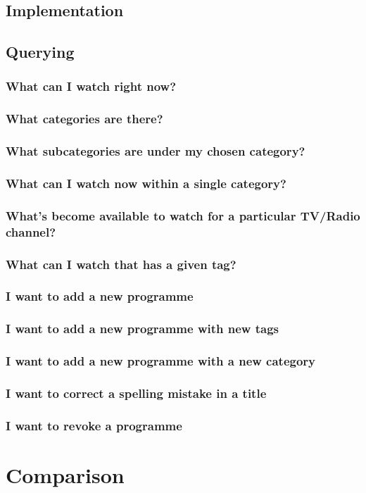 \documentclass[11pt,a4paper]{article}
\begin{document}
\subsection{Implementation}
\subsection{Querying}
\subsubsection{What can I watch right now?}
\subsubsection{What categories are there?}
\subsubsection{What subcategories are under my chosen category?}
\subsubsection{What can I watch now within a single category?}
\subsubsection{What's become available to watch for a particular TV/Radio channel?}
\subsubsection{What can I watch that has a given tag?}
\subsubsection{I want to add a new programme}
\subsubsection{I want to add a new programme with new tags}
\subsubsection{I want to add a new programme with a new category}
\subsubsection{I want to correct a spelling mistake in a title}
\subsubsection{I want to revoke a programme}

\section{Comparison}



\end{document}
